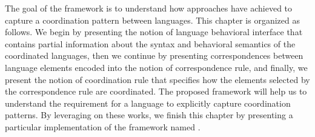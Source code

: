The goal of the framework is to understand how approaches have achieved to capture a coordination pattern between languages. This chapter is organized as follows. We begin by presenting the notion of language behavioral interface that contains partial information about the syntax and behavioral semantics of the coordinated languages, then we continue by presenting correspondences between language elements encoded into the notion of correspondence rule, and finally, we present the notion of coordination rule that specifies how the elements selected by the correspondence rule are coordinated. The proposed framework will help us to understand the requirement for a language to explicitly capture coordination patterns. By leveraging on these works, we finish this chapter by  presenting a particular implementation of the framework named \bcool.   

